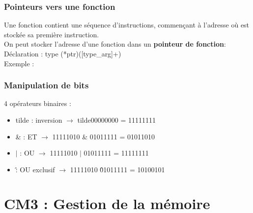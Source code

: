 \documentclass{article}
\newcommand{\insertslide}[2]{
\begin{center}
    \fbox{\texttt{[image: \#1]}}
\end{center}
}
\begin{document}
        \subsubsection{Pointeurs vers une fonction}
            Une fonction contient une séquence d'instructions, commençant à l'adresse
            où est stockée sa première instruction.\\
            On peut stocker l'adresse d'une fonction dans un \textbf{pointeur de fonction}:\\
            Déclaration : type (*ptr)([type\_arg]+)\\
            Exemple :
            \insertslide{Slides/CM2.pdf}{50}
        
        \subsubsection{Manipulation de bits}
            4 opérateurs binaires :
            \begin{itemize}
                \item tilde : inversion $\rightarrow$ tilde00000000 = 11111111
                \item \& : ET $\rightarrow$ 11111010 \& 01011111 = 01011010
                \item $|$ : OU $\rightarrow$ 11111010 $|$ 01011111 = 11111111
                \item \^ : OU exclusif $\rightarrow$ 11111010 \^ 01011111 = 10100101
            \end{itemize}
\pagebreak

\section{CM3 : Gestion de la mémoire}
\end{document}
